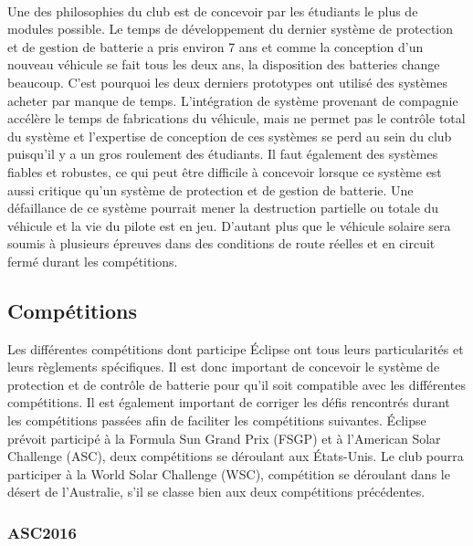 		\paragraph{}
		Une des philosophies du club est de concevoir par les étudiants le plus de modules possible. Le temps de développement du dernier système de protection et de gestion de batterie a pris environ 7 ans et comme la conception d'un nouveau véhicule se fait tous les deux ans, la disposition des batteries change beaucoup. C'est pourquoi les deux derniers prototypes ont utilisé des systèmes acheter par manque de temps. L'intégration de système provenant de compagnie accélère le temps de fabrications du véhicule, mais ne permet pas le contrôle total du système et l'expertise de conception de ces systèmes se perd au sein du club puisqu'il y a un gros roulement des étudiants. Il faut également des systèmes fiables et robustes, ce qui peut être difficile à concevoir lorsque ce système est aussi critique qu'un système de protection et de gestion de batterie. Une défaillance de ce système pourrait mener la destruction partielle ou totale du véhicule et la vie du pilote est en jeu. D'autant plus que le véhicule solaire sera soumis à plusieurs épreuves dans des conditions de route réelles et en circuit fermé durant les compétitions.
		
		
		\subsection{Compétitions}
		Les différentes compétitions dont participe Éclipse ont tous leurs particularités et leurs règlements spécifiques. Il est donc important de concevoir le système de protection et de contrôle de batterie pour qu'il soit compatible avec les différentes compétitions. Il est également important de corriger les défis rencontrés durant les compétitions passées afin de faciliter les compétitions suivantes. Éclipse prévoit participé à la Formula Sun Grand Prix (FSGP) et à l'American Solar Challenge (ASC), deux compétitions se déroulant aux États-Unis. Le club pourra participer à la World Solar Challenge (WSC), compétition se déroulant dans le désert de l'Australie, s'il se classe bien aux deux compétitions précédentes.
		
		\subsubsection{ASC2016}
		
